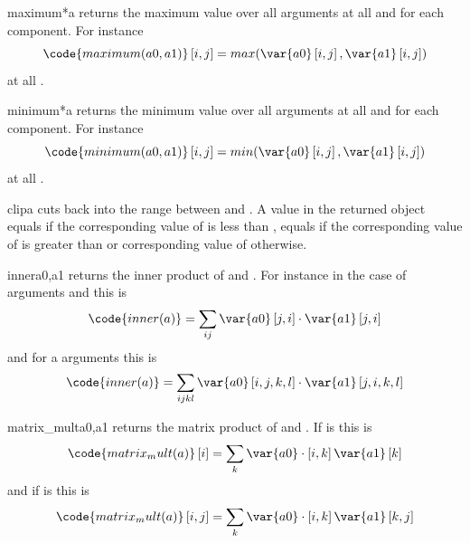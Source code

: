 \begin{funcdesc}{maximum}{*a}
returns the maximum value over all arguments at all \DataSamplePoints and for each component.
For instance
\begin{equation}
\code{maximum(a0,a1)}\left[i,j\right]=max(\var{a0} \left[i,j\right],\var{a1} \left[i,j\right])
\end{equation}
at all \DataSamplePoints.
\end{funcdesc}
\begin{funcdesc}{minimum}{*a}
returns the minimum value over all arguments at all \DataSamplePoints and for each component.
For instance
\begin{equation}
\code{minimum(a0,a1)}\left[i,j\right]=min(\var{a0} \left[i,j\right],\var{a1} \left[i,j\right])
\end{equation}
at all \DataSamplePoints.
\end{funcdesc}

\begin{funcdesc}{clip}{a}
cuts back  into the range between  and . A value in the returned object equals
 if the corresponding value of  is less than , equals  if the
 corresponding value of  is greater than 
or corresponding value of  otherwise.
\end{funcdesc}
\begin{funcdesc}{inner}{a0,a1}
returns the inner product of  and . For instance in the
case of \RankTwo arguments and this is
\begin{equation}
\code{inner(a)}=\sum_{ij}\var{a0} \left[j,i\right]  \cdot \var{a1} \left[j,i\right]
\end{equation}
and for a \RankFour arguments this is
\begin{equation}
\code{inner(a)}=\sum_{ijkl}\var{a0} \left[i,j,k,l\right]  \cdot \var{a1} \left[j,i,k,l\right]
\end{equation}
\end{funcdesc}

\begin{funcdesc}{matrix_mult}{a0,a1}
returns the matrix product of  and . If  is \RankOne this is
\begin{equation}
\code{matrix_mult(a)}\left[i\right]=\sum_{k}\var{a0}  \cdot \left[i,k\right]\var{a1} \left[k\right]
\end{equation}
and if  is \RankTwo this is
\begin{equation}
\code{matrix_mult(a)}\left[i,j\right]=\sum_{k}\var{a0}  \cdot \left[i,k\right]\var{a1} \left[k,j\right]
\end{equation}
\end{funcdesc}

